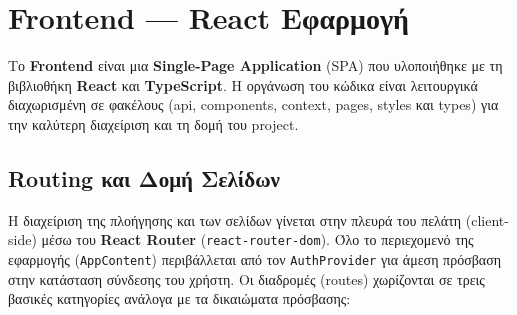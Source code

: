 \documentclass[12pt]{fphw}
\newcommand{\en}[1]{\foreignlanguage{english}{#1}}
\begin{document}
\newpage

\section{Frontend — React Εφαρμογή}
Το \en{\textbf{Frontend}} είναι μια \en{\textbf{Single-Page Application} (SPA)} που υλοποιήθηκε με τη βιβλιοθήκη \en{\textbf{React}} και \en{\textbf{TypeScript}}. Η οργάνωση του κώδικα είναι λειτουργικά διαχωρισμένη σε φακέλους (\en{api, components, context, pages, styles} και \en{types}) για την καλύτερη διαχείριση και τη δομή του project.

\subsection{Routing και Δομή Σελίδων}
Η διαχείριση της πλοήγησης και των σελίδων γίνεται στην πλευρά του πελάτη (\en{client-side}) μέσω του \en{\textbf{React Router}} (\en{\texttt{react-router-dom}}). Όλο το περιεχομενό της εφαρμογής (\en{\texttt{AppContent}}) περιβάλλεται από τον \en{\texttt{AuthProvider}} για άμεση πρόσβαση στην κατάσταση σύνδεσης του χρήστη. Οι διαδρομές (\en{routes}) χωρίζονται σε τρεις βασικές κατηγορίες ανάλογα με τα δικαιώματα πρόσβασης:
\end{document}

